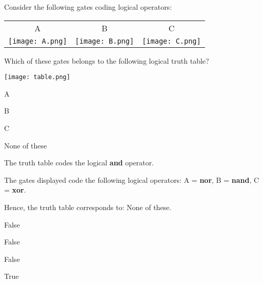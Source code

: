 
\begin{question}

Consider the following gates coding logical operators:

\begin{tabular}{ccc}
A & B & C\\

\texttt{[image: A.png]}
&

\texttt{[image: B.png]}
&

\texttt{[image: C.png]}
\end{tabular}

Which of these gates belongs to the following logical truth table?

\texttt{[image: table.png]}

\begin{answerlist}
  \item A
  \item B
  \item C
  \item None of these
\end{answerlist}
\end{question}


\begin{solution}

The truth table codes the logical \textbf{and} operator.

The gates displayed code the following logical operators:
A = \textbf{nor},
B = \textbf{nand},
C = \textbf{xor}.

Hence, the truth table corresponds to:
None of these.

\begin{answerlist}
  \item False
  \item False
  \item False
  \item True
\end{answerlist}
\end{solution}

